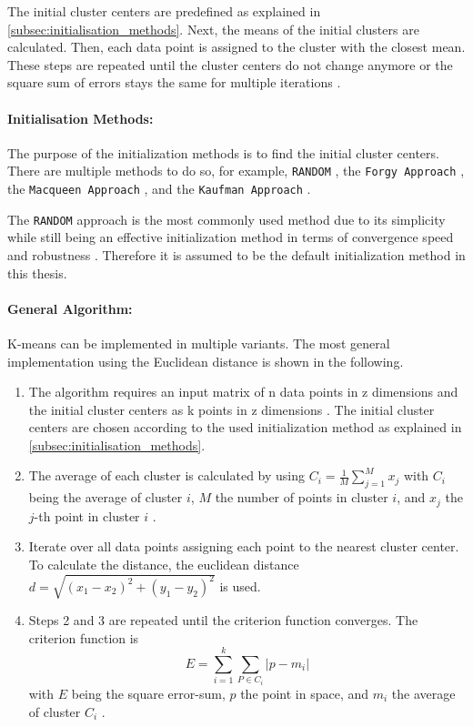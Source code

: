 The initial cluster centers are predefined as explained in \autoref{subsec:initialisation_methods}.
Next, the means of the initial clusters are calculated.
Then, each data point is assigned to the cluster with the closest mean.
These steps are repeated until the cluster centers do not change anymore or the square sum of errors stays the same for multiple iterations \cite{HAR-KMA}.

\paragraph*{Initialisation Methods:}
\label{subsec:initialisation_methods}
The purpose of the initialization methods is to find the initial cluster centers.
There are multiple methods to do so, for example, \texttt{RANDOM} \cite{PEN-ECI}, the \texttt{Forgy Approach} \cite{AND-CAA}, the \texttt{Macqueen Approach} \cite{MCQ-MCA}, and the \texttt{Kaufman Approach} \cite{KAU-FGD}.

The \texttt{RANDOM} approach is the most commonly used method due to its simplicity while still being an effective initialization method in terms of convergence speed and robustness \cite{PEN-ECI}.
Therefore it is assumed to be the default initialization method in this thesis.

\paragraph*{General Algorithm:}
K-means can be implemented in multiple variants.
The most general implementation using the Euclidean distance is shown in the following.
\begin{enumerate}
    \item The algorithm requires an input matrix of n data points in z dimensions and the initial cluster centers as k points in z dimensions \cite{HAR-KMA}.
          The initial cluster centers are chosen according to the used initialization method as explained in \autoref{subsec:initialisation_methods}.
    \item The average of each cluster is calculated by using $C_i = \frac{1}{M} \sum_{j=1}^{M}x_j$ with $C_i$ being the average of cluster $i$, $M$ the number of points in cluster $i$, and $x_j$ the $j$-th point in cluster $i$ \cite{SYA-IKC}.
    \item Iterate over all data points assigning each point to the nearest cluster center.
          To calculate the distance, the euclidean distance $d = \sqrt{(x_1-x_2)^2+(y_1-y_2)^2}$ is used.
    \item Steps 2 and 3 are repeated until the criterion function converges.
          The criterion function is \begin{equation}\label{eq:sse}E=\sum_{i=1}^{k} \sum_{P \in C_i}|p-m_i|\end{equation} with $E$ being the square error-sum, $p$ the point in space, and $m_i$ the average of cluster $C_i$ \cite{LIU-BDE}.
\end{enumerate}

